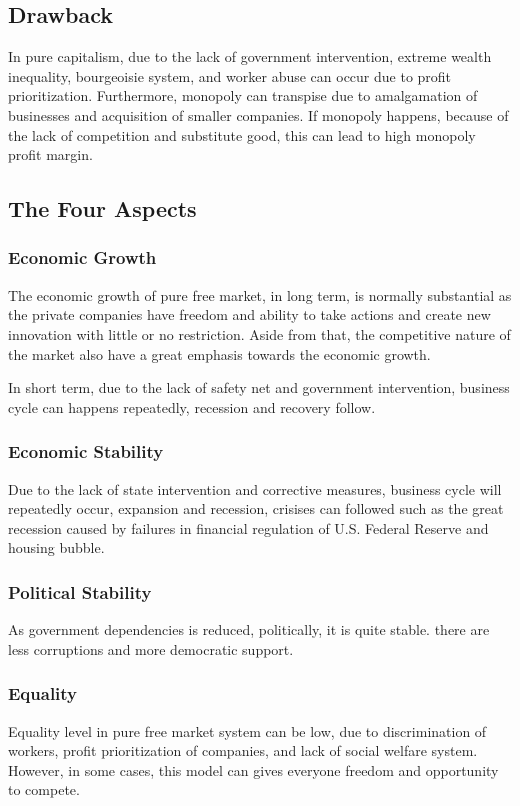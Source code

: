 \documentclass[12pt,twocolumn,a4paper]{article}
\begin{document}
\subsection{Drawback}
In pure capitalism, due to the lack of government intervention, extreme wealth inequality, bourgeoisie system, and worker abuse can occur due to profit prioritization. Furthermore, monopoly can transpise due to amalgamation of businesses and acquisition of smaller companies. If monopoly happens, because of the lack of competition and substitute good, this can lead to high monopoly profit margin.

\subsection{The Four Aspects}
\subsubsection{Economic Growth}
The economic growth of pure free market, in long term, is normally substantial as the private companies have freedom and ability to take actions and create new innovation with little or no restriction. Aside from that, the competitive nature of the market also have a great emphasis towards the economic growth.

In short term, due to the lack of safety net and government intervention, business cycle can happens repeatedly, recession and recovery follow.
\subsubsection{Economic Stability}
Due to the lack of state intervention and corrective measures, business cycle will repeatedly occur, expansion and recession, crisises can followed such as the great recession caused by failures in financial regulation of U.S. Federal Reserve and housing bubble.

\subsubsection{Political Stability}
As government dependencies is reduced, politically, it is quite stable. there are less corruptions and more democratic support.

\subsubsection{Equality}
Equality level in pure free market system can be low, due to discrimination of workers, profit prioritization of companies, and lack of social welfare system. However, in some cases, this model can gives everyone freedom and opportunity to compete.
\end{document}
